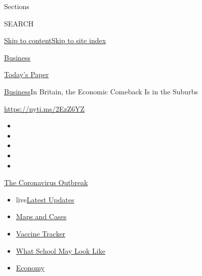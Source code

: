 Sections

SEARCH

\protect\hyperlink{site-content}{Skip to
content}\protect\hyperlink{site-index}{Skip to site index}

\href{https://www.nytimes.com/section/business}{Business}

\href{https://myaccount.nytimes.com/auth/login?response_type=cookie\&client_id=vi}{}

\href{https://www.nytimes.com/section/todayspaper}{Today's Paper}

\href{/section/business}{Business}\textbar{}In Britain, the Economic
Comeback Is in the Suburbs

\url{https://nyti.ms/2EzZ6YZ}

\begin{itemize}
\item
\item
\item
\item
\item
\end{itemize}

\href{https://www.nytimes.com/news-event/coronavirus?action=click\&pgtype=Article\&state=default\&region=TOP_BANNER\&context=storylines_menu}{The
Coronavirus Outbreak}

\begin{itemize}
\tightlist
\item
  live\href{https://www.nytimes.com/2020/08/01/world/coronavirus-covid-19.html?action=click\&pgtype=Article\&state=default\&region=TOP_BANNER\&context=storylines_menu}{Latest
  Updates}
\item
  \href{https://www.nytimes.com/interactive/2020/us/coronavirus-us-cases.html?action=click\&pgtype=Article\&state=default\&region=TOP_BANNER\&context=storylines_menu}{Maps
  and Cases}
\item
  \href{https://www.nytimes.com/interactive/2020/science/coronavirus-vaccine-tracker.html?action=click\&pgtype=Article\&state=default\&region=TOP_BANNER\&context=storylines_menu}{Vaccine
  Tracker}
\item
  \href{https://www.nytimes.com/interactive/2020/07/29/us/schools-reopening-coronavirus.html?action=click\&pgtype=Article\&state=default\&region=TOP_BANNER\&context=storylines_menu}{What
  School May Look Like}
\item
  \href{https://www.nytimes.com/live/2020/07/31/business/stock-market-today-coronavirus?action=click\&pgtype=Article\&state=default\&region=TOP_BANNER\&context=storylines_menu}{Economy}
\end{itemize}


